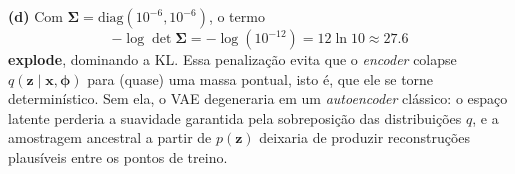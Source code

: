 \documentclass[11pt,a4paper]{article}
\begin{document}
\textbf{(d)} Com $\boldsymbol{\Sigma} = \mathrm{diag}(10^{-6}, 10^{-6})$, o termo
\[
    -\log\det\boldsymbol{\Sigma} = -\log\!\left(10^{-12}\right) = 12\ln 10 \approx 27.6
\]
\textbf{explode}, dominando a KL. Essa penalização evita que o \textit{encoder} colapse $q(\mathbf{z} \mid \mathbf{x}, \boldsymbol{\phi})$ para (quase) uma massa pontual, isto é, que ele se torne determinístico. Sem ela, o VAE degeneraria em um \textit{autoencoder} clássico: o espaço latente perderia a suavidade garantida pela sobreposição das distribuições $q$, e a amostragem ancestral a partir de $p(\mathbf{z})$ deixaria de produzir reconstruções plausíveis entre os pontos de treino.

\color{black}
\end{document}
